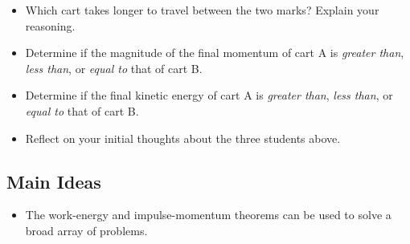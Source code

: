 \documentclass[]{article}
\begin{document}
\begin{PresentSpace}
\begin{itemize}
	\item Which cart takes longer to travel between the two marks? Explain your reasoning.
	\item Determine if the magnitude of the final momentum of cart A is \textit{greater than}, \textit{less than}, or \textit{equal to} that of cart B.
	\item Determine if the final kinetic energy of cart A is \textit{greater than}, \textit{less than}, or \textit{equal to} that of cart B.
	\item Reflect on your initial thoughts about the three students above.
\end{itemize}
\begin{center}
	\large
\end{center}
\end{PresentSpace}
\newpage
\begin{TeacherMargin}

\end{TeacherMargin}
\begin{PresentSpace}
\section*{Main Ideas}
\begin{itemize}
	\item The work-energy and impulse-momentum theorems can be used to solve a broad array of problems.
\end{itemize}
\end{PresentSpace}
\end{document}
